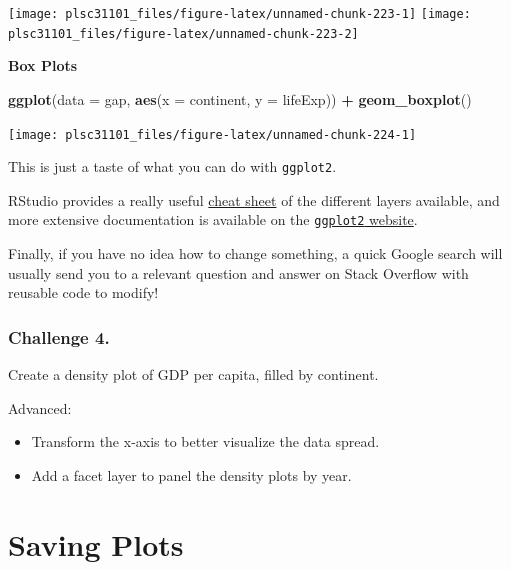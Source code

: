 \documentclass[]{book}
\newenvironment{Shaded}{\begin{snugshade}}{\end{snugshade}}
\newcommand{\KeywordTok}[1]{\textcolor[rgb]{0.13,0.29,0.53}{\textbf{#1}}}
\newcommand{\DataTypeTok}[1]{\textcolor[rgb]{0.13,0.29,0.53}{#1}}
\newcommand{\StringTok}[1]{\textcolor[rgb]{0.31,0.60,0.02}{#1}}
\newcommand{\OperatorTok}[1]{\textcolor[rgb]{0.81,0.36,0.00}{\textbf{#1}}}
\newcommand{\NormalTok}[1]{#1}
\providecommand{\tightlist}{%
  \setlength{\itemsep}{0pt}\setlength{\parskip}{0pt}}
\begin{document}
\begin{center}\texttt{[image: plsc31101\_files/figure-latex/unnamed-chunk-223-1]} \texttt{[image: plsc31101\_files/figure-latex/unnamed-chunk-223-2]} \end{center}

\textbf{Box Plots}

\begin{Shaded}
\begin{Highlighting}[]
\KeywordTok{ggplot}\NormalTok{(}\DataTypeTok{data =}\NormalTok{ gap, }\KeywordTok{aes}\NormalTok{(}\DataTypeTok{x =}\NormalTok{ continent, }\DataTypeTok{y =}\NormalTok{ lifeExp)) }\OperatorTok{+}\StringTok{ }
\StringTok{  }\KeywordTok{geom_boxplot}\NormalTok{()}
\end{Highlighting}
\end{Shaded}

\begin{center}\texttt{[image: plsc31101\_files/figure-latex/unnamed-chunk-224-1]} \end{center}

This is just a taste of what you can do with \texttt{ggplot2}.

RStudio provides a really useful
\href{https://www.rstudio.com/wp-content/uploads/2015/03/ggplot2-cheatsheet.pdf}{cheat
sheet} of the different layers available, and more extensive
documentation is available on the
\href{http://docs.ggplot2.org/current/}{\texttt{ggplot2} website}.

Finally, if you have no idea how to change something, a quick Google
search will usually send you to a relevant question and answer on Stack
Overflow with reusable code to modify!

\subsubsection*{Challenge 4.}\label{challenge-4.-1}

Create a density plot of GDP per capita, filled by continent.

Advanced:

\begin{itemize}
\tightlist
\item
  Transform the x-axis to better visualize the data spread.
\item
  Add a facet layer to panel the density plots by year.
\end{itemize}

\section{Saving Plots}\label{saving-plots}
\end{document}
